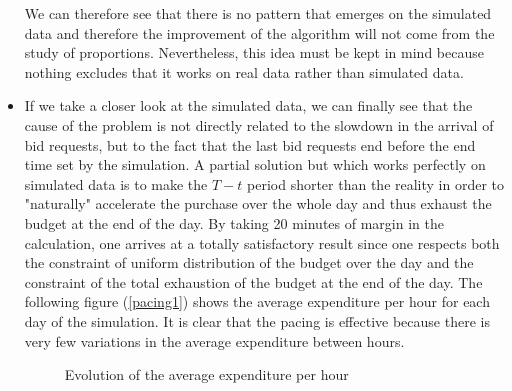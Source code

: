 \documentclass[12pt]{article}
\begin{document}
\begin{itemize}
We can therefore see that there is no pattern that emerges on the simulated data and therefore the improvement of the algorithm will not come from the study of proportions. Nevertheless, this idea must be kept in mind because nothing excludes that it works on real data rather than simulated data. 
\item If we take a closer look at the simulated data, we can finally see that the cause of the problem is not directly related to the slowdown in the arrival of bid requests, but to the fact that the last bid requests end before the end time set by the simulation. A partial solution but which works perfectly on simulated data is to make the $T-t$ period shorter than the reality in order to "naturally" accelerate the purchase over the whole day and thus exhaust the budget at the end of the day. By taking 20 minutes of margin in the calculation, one arrives at a totally satisfactory result since one respects both the constraint of uniform distribution of the budget over the day and the constraint of the total exhaustion of the budget at the end of the day. The following figure (\autoref{pacing1}) shows the average expenditure per hour for each day of the simulation. It is clear that the pacing is effective because there is very few variations in the average expenditure between hours. 

\begin{figure}[h!]
	\centering
	\caption{Evolution of the average expenditure per hour}
	\label{pacing1}
\end{figure}

\end{itemize}

\newpage
\end{document}
